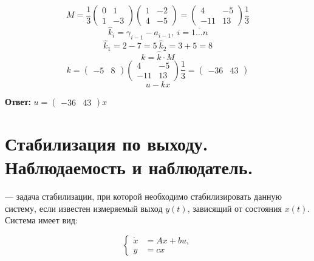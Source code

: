 \documentclass[../../TAU.tex]{subfiles}
\begin{document}
    $$
        M=\frac{1}{3}  
        \begin{pmatrix}
            0 & 1\\
            1 & -3
        \end{pmatrix}
        \begin{pmatrix}
            1 & -2\\
            4 & -5
        \end{pmatrix}
        =
        \begin{pmatrix}
            4 & -5\\
            -11 & 13
        \end{pmatrix}
        \frac{1}{3}  
    $$
    $$
        \widehat k_i=\gamma    _{i-1}-a_{i-1},\ i=\overline{1\dots n}
    $$
    $$
        \widehat k_1 = 2-7=5\ \widehat k_2 =3+5=8
    $$
    $$
        k=\widehat k\cdot M
    $$
    $$
        k=
        \begin{pmatrix}
        -5 & 8
        \end{pmatrix}
        \begin{pmatrix}
            4 & -5\\
            -11 & 13
        \end{pmatrix}
        \frac{1}{3}
        =
        \begin{pmatrix}
            -36 & 43
        \end{pmatrix}
    $$
    $$
        u -kx
    $$

    \textbf{Ответ: }
    $
        u=
        \begin{pmatrix}
            -36 & 43
        \end{pmatrix}
        x
    $

\section{Стабилизация по выходу. Наблюдаемость и наблюдатель.}

     --- задача стабилизации, при которой необходимо стабилизировать данную систему, если известен измеряемый выход $y(t)$, зависящий от состояния $x(t)$. Система имеет вид:

    \begin{equation}\label{DS}
        \left\{
        \begin{aligned}
            \dot x &= Ax + bu,\\
            y &= c x
        \end{aligned}
        \right.
    \end{equation}
\end{document}

